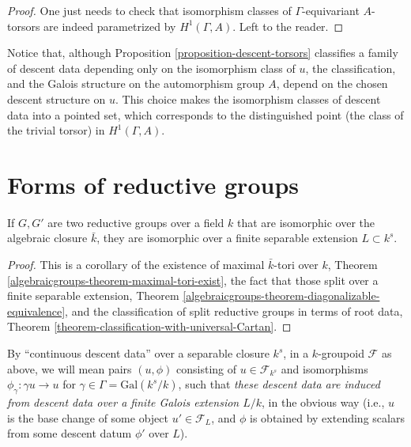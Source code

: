\begin{proof}
 One just needs to check that isomorphism classes of $\Gamma$-equivariant $A$-torsors are indeed parametrized by $H^1(\Gamma, A)$. Left to the reader.
\end{proof}



\begin{remark}
 \label{remark-torsors-base-point}
Notice that, although Proposition \ref{proposition-descent-torsors} classifies a family of descent data depending only on the isomorphism class of $u$, the classification, and the Galois structure on the automorphism group $A$, depend on the chosen descent structure on $u$. This choice makes the isomorphism classes of descent data into a pointed set, which corresponds to the distinguished point (the class of the trivial torsor) in $H^1(\Gamma, A)$.
\end{remark}




\section{Forms of reductive groups}
\label{section-forms-reductive}

\begin{lemma}
 \label{lemma-reductive-isomorphic-separable}
If $G, G'$ are two reductive groups over a field $k$ that are isomorphic over the algebraic closure $\bar k$, they are isomorphic over a finite separable extension $L\subset k^s$.
\end{lemma}

\begin{proof}
 This is a corollary of the existence of maximal $\bar k$-tori over $k$, Theorem \ref{algebraicgroups-theorem-maximal-tori-exist}, the fact that those split over a finite separable extension, Theorem \ref{algebraicgroups-theorem-diagonalizable-equivalence}, and the classification of split reductive groups in terms of root data, Theorem \ref{theorem-classification-with-universal-Cartan}.
\end{proof}

By ``continuous descent data'' over a separable closure $k^s$, in a $k$-groupoid $\mathcal F$ as above, we will mean pairs $(u,\phi)$ consisting of $u\in \mathcal F_{k^s}$ and isomorphisms $\phi_\gamma: \gamma u \to u$ for $\gamma\in\Gamma = \text{Gal}(k^s/k)$, such that \emph{these descent data are induced from descent data over a finite Galois extension $L/k$}, in the obvious way (i.e., $u$ is the base change of some object $u'\in \mathcal F_L$, and $\phi$ is obtained by extending scalars from some descent datum $\phi'$ over $L$).


